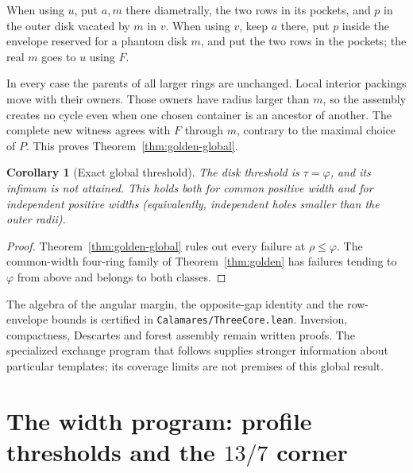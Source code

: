\documentclass[11pt]{article}
\newtheorem{corollary}[theorem]{Corollary}
\theoremstyle{definition}
\begin{document}
When using $u$, put $a,m$ there diametrally, the two rows in its
pockets, and $p$ in the outer disk vacated by $m$ in $v$. When using
$v$, keep $a$ there, put $p$ inside the envelope reserved for a phantom
disk $m$, and put the two rows in the pockets; the real $m$ goes to
$u$ using $F$.

In every case the parents of all larger rings are unchanged. Local
interior packings move with their owners. Those owners have radius
larger than $m$, so the assembly creates no cycle even when one chosen
container is an ancestor of another. The complete new witness agrees
with $F$ through $m$, contrary to the maximal choice of $P$. This proves
Theorem~\ref{thm:golden-global}.


\begin{corollary}[Exact global threshold]\label{cor:golden-global}
The disk threshold is $\tau=\varphi$, and its infimum is not attained.
This holds both for common positive width and for independent positive
widths (equivalently, independent holes smaller than the outer radii).
\end{corollary}
\begin{proof}
Theorem~\ref{thm:golden-global} rules out every failure at
$\rho\le\varphi$. The common-width four-ring family of
Theorem~\ref{thm:golden} has failures tending to $\varphi$ from above
and belongs to both classes.
\end{proof}
The algebra of the angular margin, the opposite-gap identity and the
row-envelope bounds is certified in \texttt{Calamares/ThreeCore.lean}.
Inversion, compactness, Descartes and forest assembly remain written
proofs. The specialized exchange program that follows supplies stronger
information about particular templates; its coverage limits are not
premises of this global result.


\section{The width program: profile thresholds and the \texorpdfstring{$13/7$}{13/7} corner}
\label{sec:width}
\end{document}
